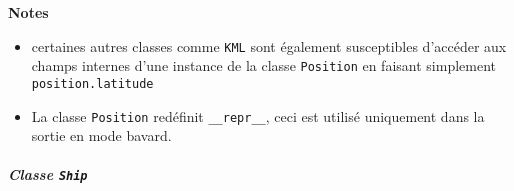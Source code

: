     \begin{Shaded}
\begin{Highlighting}[frame=lines,framerule=0.6mm,rulecolor=\color{asisframecolor}]
    
    \NormalTok{)}
     \OperatorTok{|}
     \OperatorTok{|}  
     \OperatorTok{|}
     \OperatorTok{|}  
     \OperatorTok{|}  \NormalTok{(}
     \OperatorTok{|}
     \OperatorTok{|}  
     \OperatorTok{|}  \NormalTok{(}\NormalTok{)}
     \OperatorTok{|}
     \OperatorTok{|}  
\end{Highlighting}
\end{Shaded}

    \textbf{Notes}

\begin{itemize}
\tightlist
\item
  certaines autres classes comme \texttt{KML} sont également
  susceptibles d'accéder aux champs internes d'une instance de la classe
  \texttt{Position} en faisant simplement \texttt{position.latitude}
\item
  La classe \texttt{Position} redéfinit \texttt{\_\_repr\_\_}, ceci est
  utilisé uniquement dans la sortie en mode bavard.
\end{itemize}

    \hypertarget{classe-ship}{%
\subparagraph{\texorpdfstring{Classe
\texttt{Ship}}{Classe Ship}}\label{classe-ship}}

